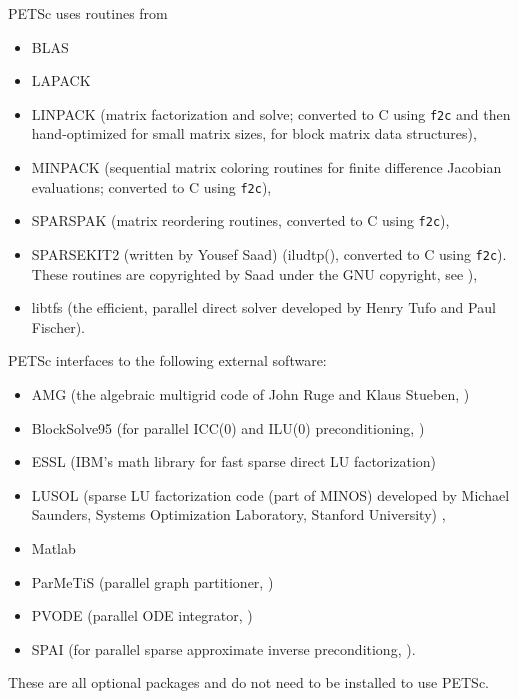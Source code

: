 \vspace{.3in}
\noindent
PETSc uses routines from 
\begin{itemize}
  \item BLAS
  \item LAPACK
  \item LINPACK      (matrix factorization and solve; converted to C using {\tt f2c} and then 
                      hand-optimized for small matrix sizes, for block matrix data structures),
  \item MINPACK      (sequential matrix coloring routines for finite difference Jacobian
                       evaluations; converted to C using {\tt f2c}),
  \item SPARSPAK     (matrix reordering routines, converted to C using {\tt f2c}),
  \item SPARSEKIT2 (written by Yousef Saad) (iludtp(), converted to C using {\tt f2c}). These routines 
                     are copyrighted by Saad under the GNU copyright, see ),
  \item libtfs (the efficient, parallel direct solver developed by Henry Tufo and Paul Fischer).
\end{itemize}


\vspace{.3in}
\noindent
PETSc interfaces to the following external software:
\begin{itemize}
  \item AMG          (the algebraic multigrid code of John Ruge and Klaus Stueben,
                     )
  \item BlockSolve95 (for parallel ICC(0) and ILU(0) preconditioning,
                     )
  \item ESSL         (IBM's math library for fast sparse direct LU factorization)
  \item LUSOL        (sparse LU factorization code (part of MINOS) developed by Michael Saunders,
                      Systems Optimization Laboratory, Stanford University)
                     ,
  \item Matlab       
  \item ParMeTiS      (parallel graph partitioner, )
  \item PVODE        (parallel ODE integrator, )
  \item SPAI         (for parallel sparse approximate inverse preconditiong, 
                     ).
\end{itemize}
These are all optional packages and do not need to be installed to use PETSc.


